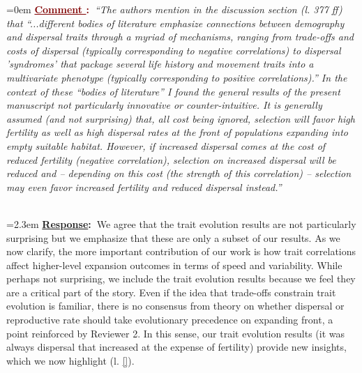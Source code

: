 \documentclass[12pt]{article}
\newcounter{cN}
\newcommand{\comment}[1]{
	\vspace{2em}
	\refstepcounter{cN} %
	\noindent \hangindent=0em \textbf{\textcolor{Maroon}{\uline{Comment \thecN}:~}}\emph{``#1''}
	}
\newcommand{\response}[1]{
	\\[0.25em]
	\hangindent=2.3em \textbf{\textcolor{NavyBlue}{\uline{Response}:~}}#1
	}
\begin{document}
\comment{The authors mention in the discussion section (l. 377 ff) that ``...different bodies of literature emphasize connections between demography and dispersal traits through a myriad of mechanisms, ranging from trade-offs and costs of dispersal (typically corresponding to negative correlations) to dispersal 'syndromes' that package several life history and movement traits into a multivariate phenotype (typically corresponding to positive correlations).''
In the context of these ``bodies of literature'' I found the general results of the present manuscript not particularly innovative or counter-intuitive.
It is generally assumed (and not surprising) that, all cost being ignored, selection will favor high fertility as well as high dispersal rates at the front of populations expanding into empty suitable habitat.
However, if increased dispersal comes at the cost of reduced fertility (negative correlation), selection on increased dispersal will be reduced and – depending on this cost (the strength of this correlation) – selection may even favor increased fertility and reduced dispersal instead.}
\response{We agree that the trait evolution results are not particularly surprising but we emphasize that these are only a subset of our results.
As we now clarify, the more important contribution of our work is how trait correlations affect higher-level expansion outcomes in terms of speed and variability.
While perhaps not surprising, we include the trait evolution results because we feel they are a critical part of the story.
Even if the idea that trade-offs constrain trait evolution is familiar, there is no consensus from theory on whether dispersal or reproductive rate should take evolutionary precedence on expanding front, a point reinforced by Reviewer 2.
In this sense, our trait evolution results (it was always dispersal that increased at the expense of fertility) provide new insights, which we now highlight (l. \ref{}).}
\end{document}
